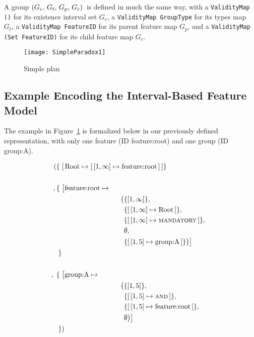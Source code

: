 A group $\left(G_e,\, G_t,\, G_p,\, G_c\right){}$ is defined in much the same way, with a \texttt{Validity\-Map ()} for its existence interval set $G_e$, a \texttt{Validity\-Map Group\-Type} for its types map $G_t$, a \texttt{Validity\-Map Feature\-ID} for its parent feature map $G_p$, and a \texttt{Validity\-Map (Set Feature\-ID)} for its child feature map $G_c$. 

\begin{figure}
   \centering
      \texttt{[image: SimpleParadox1]}
   \caption{Simple plan}
   \label{ex:simple-plan}
\end{figure}

\subsection{Example \textemdash{} Encoding the Interval-Based Feature Model}

The example in Figure~\ref{ex:simple-plan} is formalized below in our previously defined representation, with only one feature (ID feature:root) and one group (ID group:A).

\begin{align*}
 ( \{ \; & \mapping{\text{Root}}{\intervalmapping{1}{\forever}{\text{feature:root}}} \} \\
    \\
 ,\{\; & \big[\text{feature:root} \mapsto \\
       & \hspace{3cm} \begin{aligned} \big( & \{ \interval{1}{\forever}\} ,\, \\
       & \{\intervalmapping{1}{\forever}{\text{Root}}\} ,\, \\
       & \{\intervalmapping{1}{\forever}{\mandatory{}}\} ,\, \\
       &  \emptyset ,\, \\ 
       & \{\intervalmapping{1}{5}{\text{group:A}}\} \big)\big] \\
         \end{aligned} \\
       \} &\\
          \\
            ,\; \{ \; & \big[ \text{group:A} \mapsto \\
                      & \hspace{3cm} \begin{aligned} \big( & \{\interval{1}{5}\} ,\, \\
                      & \{\intervalmapping{1}{5}{\andtype{}}\} ,\, \\
                      & \{\intervalmapping{1}{5}{\text{feature:root}}\} ,\, \\
                      & \emptyset \big) \big]\\
                        \end{aligned}\\
 \}&)\\
\end{align*}


